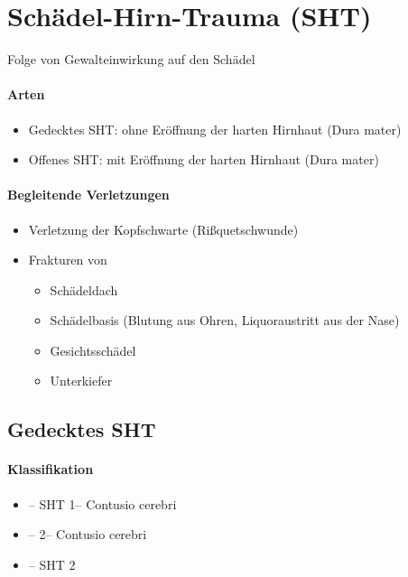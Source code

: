 \section{Sch\"adel-Hirn-Trauma (SHT)}
Folge von Gewalteinwirkung auf den  Sch\"adel

\paragraph{Arten}

\begin{itemize}
\item Gedecktes SHT: ohne  Er\"offnung der harten Hirnhaut (Dura  mater)
\item Offenes SHT: mit  Er\"offnung der harten Hirnhaut (Dura  mater)
\end{itemize}

\paragraph{Begleitende Verletzungen}

\begin{itemize}
    \item Verletzung der Kopfschwarte  (Ri{\ss}quetschwunde)
    \item Frakturen von
    \begin{itemize}
        \item Sch\"adeldach
        \item Sch\"adelbasis (Blutung aus Ohren, Liquoraustritt  aus der Nase)
        \item Gesichtssch\"adel
        \item Unterkiefer
    \end{itemize}
\end{itemize}


\subsection{Gedecktes SHT}
 
\paragraph{Klassifikation}

\begin{itemize}
\item {} -- SHT 1\textdegree --
Contusio cerebri
\item {} -- 2\textdegree -- Contusio
cerebri
\item {} -- SHT 2\textdegree 
\end{itemize}




